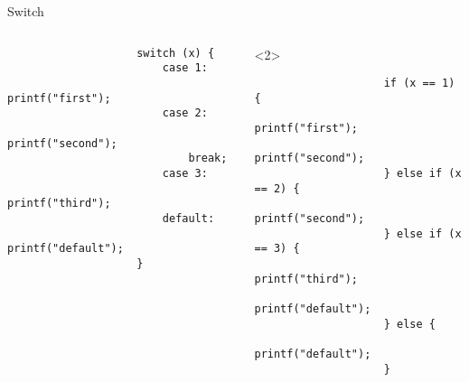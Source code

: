 \documentclass[aspectratio=169,14pt]{beamer}
\begin{document}
    \begin{frame}[fragile]{Switch}
        \begin{columns}
            \begin{column}{0.5\textwidth}
                \begin{lstlisting}
                    switch (x) {
                        case 1:
                            printf("first");
                        case 2:
                            printf("second");
                            break;
                        case 3:
                            printf("third");
                        default:
                            printf("default");
                    }
                \end{lstlisting}
            \end{column}
            \begin{column}{0.5\textwidth}<2>
                \begin{lstlisting}
                    if (x == 1) {
                        printf("first");
                        printf("second");
                    } else if (x == 2) {
                        printf("second");
                    } else if (x == 3) {
                        printf("third");
                        printf("default");
                    } else {
                        printf("default");
                    }
                \end{lstlisting}
            \end{column}
        \end{columns}
    \end{frame}
\end{document}
